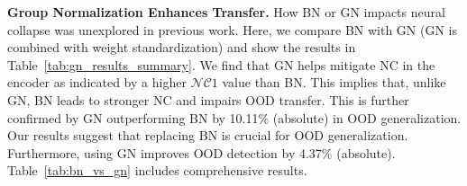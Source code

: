 \begin{table}[t]
\centering
  \caption{\textbf{Projector Configuration.} VGG17 models with different ETF projector configurations are trained on ImageNet-100 (ID) datasets and evaluated on 8 OOD datasets. $D$ and $W$ denote the depth and width of the projector, respectively.}
  \label{tab:proj_results}
  \centering
\end{table}



\noindent
\textbf{Group Normalization Enhances Transfer.}
How BN or GN impacts neural collapse was unexplored in previous work. Here, we compare BN with GN (GN is combined with weight standardization) and show the results in Table~\ref{tab:gn_results_summary}. 
We find that GN helps mitigate NC in the encoder as indicated by a higher $\mathcal{NC}1$ value than BN. This implies that, unlike GN, BN leads to stronger NC and impairs OOD transfer. This is further confirmed by GN outperforming BN by 10.11\% (absolute) in OOD generalization. Our results suggest that replacing BN is crucial for OOD generalization. Furthermore, using GN improves OOD detection by 4.37\% (absolute). 
Table~\ref{tab:bn_vs_gn} includes comprehensive results.



